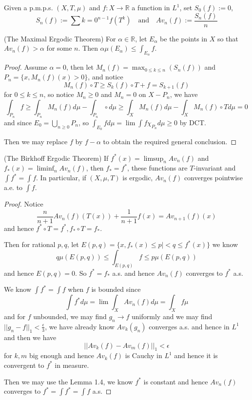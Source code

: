 \documentclass[lang=en, color=blue, ]{elegantbook}
\newcommand{\R}{\mathbb{R}}
\begin{document}
\begin{definition}
Given a p.m.p.s. $(X,T,\mu)$ and  $f:X\to\R$ a function in $L^1$, set $S_0(f):= 0$,
\[S_n(f):=\sum\limits{k=0}^{n-1} f(T^k)\quad\text{and}\quad Av_n(f):= \dfrac{S_n(f)}{n}\]
\end{definition}
\begin{theorem}
    (The Maximal Ergodic Theorem) For $\alpha\in\R$, let $E_{\alpha}$ be the points in $X$ so that $Av_n(f)>\alpha$ for some $n$. Then $\alpha\mu(E_{\alpha}) \leq \int_{E_{\alpha}} f$.
\end{theorem}
\begin{proof}\par
    Assume $\alpha = 0$, then let $M_n(f) = \max_{0\leq k\leq n}(S_n(f))$ and $P_n = \{x,M_n(f)(x)>0\}$, and notice
    \[M_n(f)\circ T \geq S_k(f)\circ T + f = S_{k+1}(f)\]
    for $0\leq k \leq n$, so notice $M_n \geq 0$ and $M_n = 0$ on $X-P_n$, we have
    \[\int_{P_n} f \geq \int_{P_n}M_n(f)d\mu - \int_{P_n}\circ d\mu \geq \int_X M_n(f)d\mu - \int_X M_n(f)\circ T d\mu = 0\]
    and since $E_0 = \bigcup_{n\geq 0} P_n$, so $\int_{E_0} f d\mu = \lim \int f\chi_{{P_n}} d\mu \geq 0$ by DCT.\par
    Then we may replace $f$ by $f-\alpha$ to obtain the required general conclusion.\par
\end{proof}

\begin{theorem}
    (The Birkhoff Ergodic Theorem) If $f^*(x) = \limsup_n Av_n(f)$ and $f_*(x) = \liminf_nAv_n (f)$, then $f_* = f^*$, these functions are $T$-invariant and $\int f^* = \int f$. In particular, if $(X,\mu,T)$ is ergodic, $Av_n(f)$ converges pointwise a.e. to $\int f$.
\end{theorem}
\begin{proof}\par
    Notice
    \[\dfrac{n}{n+1}Av_n(f)(T(x)) + \dfrac{1}{n+1}f(x) = Av_{n+1}(f)(x)\]
    and hence $f^*\circ T = f^*, f_*\circ T = f_*$.\par
    Then for rational $p,q$, let $E(p,q) = \{x, f_*(x)\leq p |< q \leq f^*(x)\}$ we know
    \[q\mu(E(p,q)) \leq \int_{E(p,q)} f \leq p\mu(E(p,q))\]
    and hence $E(p,q) = 0$. So $f^* = f_*$ a.s. and hence $Av_n(f)$ converges to $f^*$ a.s.\par
    We know $\int f^* = \int f$ when $f$ is bounded since
    \[\int f^* d\mu = \lim \int_X Av_n(f)d\mu = \int_X f\mu\]
    and for $f$ unbounded, we may find $g_n\to f$ uniformly and we may find $||g_n-f||_1 < \tfrac{\epsilon}{3}$, we have already know $Av_k(g_n)$ converges a.s. and hence in $L^1$ and then we have
    \[||Av_k(f)-Av_m(f)||_1 < \epsilon\]
    for $k,m$ big enough and hence $Av_k(f)$ is Cauchy in $L^1$ and hence it is convergent to $f^*$ in measure.\par
    Then we may use the Lemma 1.4, we know $f^*$ is constant and hence $Av_n(f)$ converges to $f^* = \int f^* = \int f$ a.s.\par
\end{proof}
\end{document}
